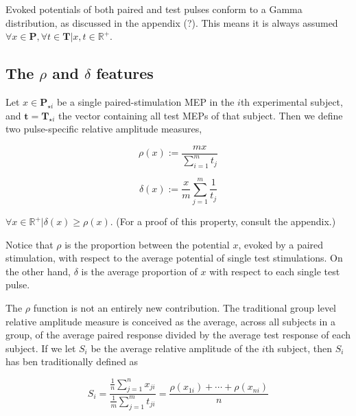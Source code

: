 \documentclass{article}
\begin{document}
\begin{remark}
    Evoked potentials of both paired and test pulses conform to a Gamma distribution, as discussed in the appendix (?). This means it is always assumed $\forall x \in \textbf{P}, \forall t\in \textbf{T}|x, t \in \mathbb{R}^+$.
\end{remark}

\subsection{The $\rho$ and $\delta$ features}


\begin{definition}
Let $x \in \textbf{P}_{\star i}$ be a single paired-stimulation MEP in the $i$th experimental subject, and $\textbf{t} = \textbf{T}_{\star i}$ the vector containing all test MEPs of that subject. Then we define two pulse-specific relative amplitude measures,

\begin{equation}
    \rho(x) := \frac{mx}{\sum_{i=1}^mt_j}
\end{equation}

\begin{equation}
    \delta(x) := \frac{x}{m}\sum_{j=1}^m\frac{1}{t_j}
\end{equation}
\end{definition}

\begin{remark}
    $\forall x \in \mathbb{R}^+|\delta(x) \geq \rho(x)$. (For a proof of this property, consult the appendix.)
\end{remark}

Notice that $\rho$ is the proportion between the potential $x$, evoked by a paired stimulation, with respect to the average potential of single test stimulations. On the other hand, $\delta$ is the average proportion of $x$ with respect to each single test pulse.


The $\rho$ function is not an entirely new contribution. The traditional group level relative amplitude measure is conceived as the average, across all subjects in a group, of the average paired response divided by the average test response of each subject. If we let $S_i$ be the average relative amplitude of the $i$th subject, then $S_i$ has ben traditionally defined as

\begin{equation}
    S_i=\frac{\frac{1}{n}\sum_{j=1}^n x_{ji}}{\frac{1}{m}\sum_{j=1}^m t_{ji}} = \frac{\rho(x_{1i})+\cdots + \rho(x_{ni})}{n}
\end{equation}
\end{document}
